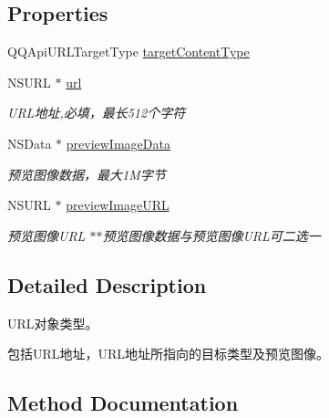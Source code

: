 \subsection*{Properties}
\begin{DoxyCompactItemize}
\item 
Q\+Q\+Api\+U\+R\+L\+Target\+Type \mbox{\hyperlink{interface_q_q_api_u_r_l_object_ac63300bde7ff3c111e301789ee0d6557}{target\+Content\+Type}}
\item 
\mbox{\label{interface_q_q_api_u_r_l_object_a5686a726251590a990115333ef704d1d}} 
N\+S\+U\+RL $\ast$ \mbox{\hyperlink{interface_q_q_api_u_r_l_object_a5686a726251590a990115333ef704d1d}{url}}
\begin{DoxyCompactList}\small\item\em U\+R\+L地址,必填，最长512个字符 \end{DoxyCompactList}\item 
\mbox{\label{interface_q_q_api_u_r_l_object_af4ea9d733ac1cf91a8a72427ebbbce80}} 
N\+S\+Data $\ast$ \mbox{\hyperlink{interface_q_q_api_u_r_l_object_af4ea9d733ac1cf91a8a72427ebbbce80}{preview\+Image\+Data}}
\begin{DoxyCompactList}\small\item\em 预览图像数据，最大1\+M字节 \end{DoxyCompactList}\item 
\mbox{\label{interface_q_q_api_u_r_l_object_ad062e8cc3a10d6e39ba93743135b4ea4}} 
N\+S\+U\+RL $\ast$ \mbox{\hyperlink{interface_q_q_api_u_r_l_object_ad062e8cc3a10d6e39ba93743135b4ea4}{preview\+Image\+U\+RL}}
\begin{DoxyCompactList}\small\item\em 预览图像\+U\+RL $\ast$$\ast$预览图像数据与预览图像\+U\+R\+L可二选一 \end{DoxyCompactList}\end{DoxyCompactItemize}


\subsection{Detailed Description}
U\+R\+L对象类型。 

包括\+U\+R\+L地址，\+U\+R\+L地址所指向的目标类型及预览图像。 

\subsection{Method Documentation}
\mbox{\label{interface_q_q_api_u_r_l_object_ac9b4f31bdacdfbc736c0fa30093de457}} 
